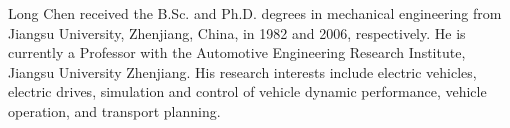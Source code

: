     \begin{IEEEbiography}{Long Chen}
        received the B.Sc. and Ph.D. degrees in mechanical engineering from Jiangsu University, Zhenjiang, China, in 1982 and 2006, respectively. He is currently a Professor with the Automotive Engineering Research Institute, Jiangsu University Zhenjiang. His research interests include electric vehicles, electric drives, simulation and control of vehicle dynamic performance, vehicle operation, and transport planning.
    \end{IEEEbiography}





